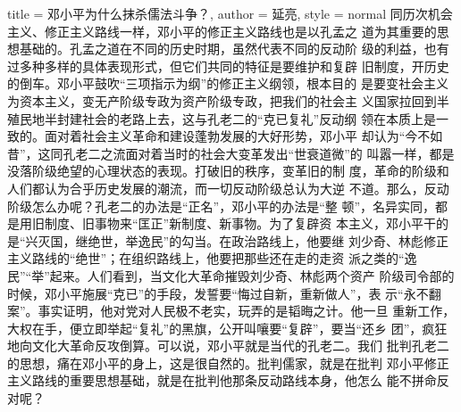 \begin{hongqiarticle}{
        title  = {邓小平为什么抹杀儒法斗争？},
        author = {延亮},
        style  = normal
    }
    同历次机会主义、修正主义路线一样，邓小平的修正主义路线也是以孔孟之
    道为其重要的思想基础的。孔孟之道在不同的历史时期，虽然代表不同的反动阶
    级的利益，也有过多种多样的具体表现形式，但它们共同的特征是要维护和复辟
    旧制度，开历史的倒车。邓小平鼓吹“三项指示为纲”的修正主义纲领，根本目的
    是要变社会主义为资本主义，变无产阶级专政为资产阶级专政，把我们的社会主
    义国家拉回到半殖民地半封建社会的老路上去，这与孔老二的“克已复礼”反动纲
    领在本质上是一致的。面对着社会主义革命和建设蓬勃发展的大好形势，邓小平
    却认为“今不如昔”，这同孔老二之流面对着当时的社会大变革发出“世衰道微”的
    叫嚣一样，都是没落阶级绝望的心理状态的表现。打破旧的秩序，变革旧的制
    度，革命的阶级和人们都认为合乎历史发展的潮流，而一切反动阶级总认为大逆
    不道。那么，反动阶级怎么办呢？孔老二的办法是“正名”，邓小平的办法是“整
    顿”，名异实同，都是用旧制度、旧事物来“匡正”新制度、新事物。为了复辟资
    本主义，邓小平干的是“兴灭国，继绝世，举逸民”的勾当。在政治路线上，他要继
    刘少奇、林彪修正主义路线的“绝世”；在组织路线上，他要把那些还在走的走资
    派之类的“逸民”“举”起来。人们看到，当文化大革命摧毁刘少奇、林彪两个资产
    阶级司令部的时候，邓小平施展“克已”的手段，发誓要“悔过自新，重新做人”，表
    示“永不翻案”。事实证明，他对党对人民极不老实，玩弄的是韬晦之计。他一旦
    重新工作，大权在手，便立即举起“复礼”的黑旗，公开叫嚷要“复辟”，要当“还乡
    团”，疯狂地向文化大革命反攻倒算。可以说，邓小平就是当代的孔老二。我们
    批判孔老二的思想，痛在邓小平的身上，这是很自然的。批判儒家，就是在批判
    邓小平修正主义路线的重要思想基础，就是在批判他那条反动路线本身，他怎么
    能不拼命反对呢？


\end{hongqiarticle}
